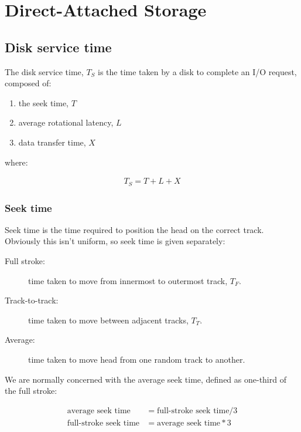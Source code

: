\chapter{Direct-Attached Storage}
\label{ch:direct-attached-storage}

\section{Disk service time}
\label{sec:disk-service-time}

The disk service time, $T_S$ is the time taken by a disk to complete an I/O
request, composed of:

\begin{enumerate}
\item
  the seek time, $T$
\item
  average rotational latency, $L$
\item
  data transfer time, $X$
\end{enumerate}

where:

\begin{align}
  T_S = T + L + X
\end{align}

\subsection{Seek time}\label{sec:seek-time}

Seek time is the time required to position the head on the correct
track. Obviously this isn't uniform, so seek time is given separately:

\begin{description}
\item[Full stroke:]
  time taken to move from innermost to outermost track, $T_F$.
\item[Track-to-track:]
  time taken to move between adjacent tracks, $T_T$.
\item[Average:]
  time taken to move head from one random track to another.
\end{description}

We are normally concerned with the average seek time, defined as one-third of the full stroke:

\begin{align}
  \mbox{average seek time} & = \mbox{full-stroke seek time} / 3 \\
  \mbox{full-stroke seek time} & = \mbox{average seek time} * 3
\end{align}

